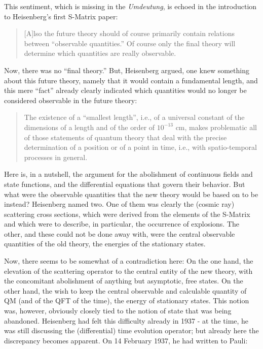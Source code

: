 \documentclass[12pt,a4paper]{article}
\begin{document}
This sentiment, which is missing in the \emph{Umdeutung}, is echoed in the introduction to Heisenberg's first S-Matrix paper:

\begin{quote}
[A]lso the future theory should of course primarily contain relations between ``observable quantities.'' Of course only the final theory will determine which quantities are really observable.
\end{quote}

Now, there was no ``final theory.'' But, Heisenberg argued, one knew something about this future theory, namely that it would contain a fundamental length, and this mere ``fact'' already clearly indicated which quantities would no longer be considered observable in the future theory:

\begin{quote}
The existence of a ``smallest length'', i.e., of a universal constant of the dimensions of a length and of the order of $10^{-13}$ cm, makes problematic all of those statements of quantum theory that deal with the precise determination of a position or of a point in time, i.e., with spatio-temporal processes in general. 
\end{quote}

Here is, in a nutshell, the argument for the abolishment of continuous fields and state functions, and the differential equations that govern their behavior. But what were the observable quantities that the new theory would be based on to be instead?  Heisenberg named two. One of them was clearly the (cosmic ray) scattering cross sections, which were derived from the elements of the S-Matrix and which were to describe, in particular, the occurrence of explosions. The other, and these could not be done away with, were the central observable quantities of the old theory, the energies of the stationary states.

Now, there seems to be somewhat of a contradiction here: On the one hand, the elevation of the scattering operator to the central entity of the new theory, with the concomitant abolishment of anything but asymptotic, free states. On the other hand, the wish to keep the central observable and calculable quantity of QM (and of the QFT of the time), the energy of stationary states. This notion was, however, obviously closely tied to the notion of state that was being abandoned. Heisenberg had felt this difficulty already in 1937 - at the time, he was still discussing the (differential) time evolution operator; but already here the discrepancy becomes apparent. On 14 February 1937, he had written to Pauli:
\end{document}
